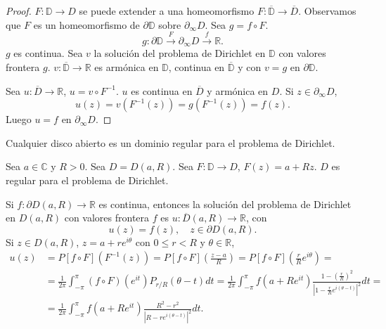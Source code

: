 \begin{proof}
    $F: \mathbb{D} \to D$ se puede extender a una homeomorfismo $F: \overline{\mathbb{D}} \to \overline{D}$.
    Observamos que $F$ es un homeomorfismo de $\partial\mathbb{D}$ sobre $\partial_\infty D$.
    Sea $g = f \circ F$.
    $$g: \partial\mathbb{D} \xrightarrow{F} \partial_\infty D \xrightarrow{f} \mathbb{R}.$$
    $g$ es continua.
    Sea $v$ la solución del problema de Dirichlet en $\mathbb{D}$ con valores frontera $g$.
    $v: \overline{\mathbb{D}} \to \mathbb{R}$ es armónica en $\mathbb{D}$, continua en $\overline{\mathbb{D}}$ y con $v = g$ en $\partial\mathbb{D}$.

    Sea $u: \overline{D} \to \mathbb{R}$, $u = v \circ F^{-1}$.
    $u$ es continua en $\overline{D}$ y armónica en $D$.
    Si $z \in \partial_\infty D$,
    $$u(z) = v(F^{-1}(z)) = g(F^{-1}(z)) = f(z).$$
    Luego $u = f$ en $\partial_\infty D$.
\end{proof}

\begin{example}
    Cualquier disco abierto es un dominio regular para el problema de Dirichlet.

    Sea $a \in \mathbb{C}$ y $R > 0$.
    Sea $D = D(a, R)$.
    Sea $F: \mathbb{D} \to D$, $F(z) = a + Rz$.
    $D$ es regular para el problema de Dirichlet.

    Si $f: \partial D(a, R) \to \mathbb{R}$ es continua, entonces la solución del problema de Dirichlet en $D(a, R)$ con valores frontera $f$ es $u: \overline{D}(a, R) \to \mathbb{R}$, con
    $$u(z) = f(z), \quad z \in \partial D(a, R).$$
    Si $z \in D(a, R)$, $z = a + re^{i\theta}$ con $0 \leq r < R$ y $\theta \in \mathbb{R}$,
    \begin{align*}
        u(z) & = P[f \circ F](F^{-1}(z)) = P[f \circ F]\left(\frac{z-a}{R}\right) = P[f \circ F]\left(\frac{r}{R}e^{i\theta}\right) =                                                                                      \\
             & = \frac{1}{2\pi} \int_{-\pi}^\pi (f \circ F)(e^{it})P_{r/R}(\theta-t)dt = \frac{1}{2\pi} \int_{-\pi}^\pi f(a + Re^{it})\frac{1-\left(\frac{r}{R}\right)^2}{\left|1-\frac{r}{R}e^{i(\theta-t)}\right|^2}dt = \\
             & = \frac{1}{2\pi} \int_{-\pi}^\pi f(a + Re^{it})\frac{R^2-r^2}{|R-re^{i(\theta-t)}|^2}dt.
    \end{align*}
\end{example}

